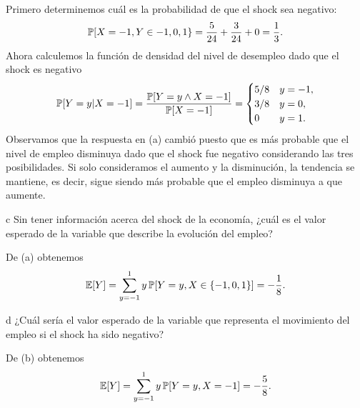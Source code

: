 \begin{solution}
  Primero determinemos cu\'al es la probabilidad de que el shock sea negativo:
  \[
    \mathbb{P}[X = -1, Y \in {-1, 0, 1}\} = \frac{5}{24} + \frac{3}{24} + 0 = \frac{1}{3}.
  \]
  Ahora calculemos la funci\'on de densidad del nivel de desempleo dado que el shock es negativo
  \[
    \mathbb{P}[Y = y | X = -1] = \frac{\mathbb{P}[Y = y \wedge X = -1]}{\mathbb{P}[X = -1]} = \begin{cases}
      5/8 & y = -1, \\
      3/8 & y = 0, \\
      0 & y = 1.
    \end{cases}
  \]
  Observamos que la respuesta en (a) cambi\'o puesto que es m\'as probable
  que el nivel de empleo disminuya dado que el shock fue negativo considerando las tres posibilidades.
  Si solo consideramos el aumento y la disminuci\'on, la tendencia se mantiene, es decir, sigue siendo m\'as probable
  que el empleo disminuya a que aumente.
\end{solution}

\begin{statement}{c}
  Sin tener informaci\'on acerca del shock de la econom\'ia,
  ¿cu\'al es el valor esperado de la variable que describe la evoluci\'on del empleo?
\end{statement}

\begin{solution}
  De (a) obtenemos
  \[
    \mathbb{E}[Y] = \sum_{y = -1}^1 y \, \mathbb{P}[Y = y, X \in \{-1, 0, 1\}] = -\frac{1}{8}.
  \]
\end{solution}

\begin{statement}{d}
  ¿Cu\'al ser\'ia el valor esperado de la variable que representa el movimiento del empleo si el shock ha sido negativo?
\end{statement}

\begin{solution}
  De (b) obtenemos
  \[
    \mathbb{E}[Y] = \sum_{y = -1}^1 y \, \mathbb{P}[Y = y, X = -1] = -\frac{5}{8}.
  \]
\end{solution}